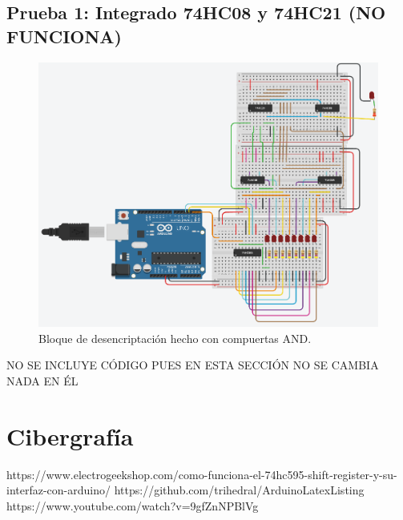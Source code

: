 \documentclass{article}
\begin{document}
\subsection{Prueba 1: Integrado 74HC08 y 74HC21 (NO FUNCIONA)}

\begin{figure}[h]
\includegraphics[scale=0.8]{74HC08.png}
\centering
\caption{Bloque de desencriptación hecho con compuertas AND.}
\label{fig:74HC08}
\end{figure}

NO SE INCLUYE CÓDIGO PUES EN ESTA SECCIÓN NO SE CAMBIA NADA EN ÉL

\section{Cibergrafía} \label{ciber}

https://www.electrogeekshop.com/como-funciona-el-74hc595-shift-register-y-su-interfaz-con-arduino/
\newline
https://github.com/trihedral/ArduinoLatexListing
\newline
https://www.youtube.com/watch?v=9gfZnNPBlVg
\end{document}
